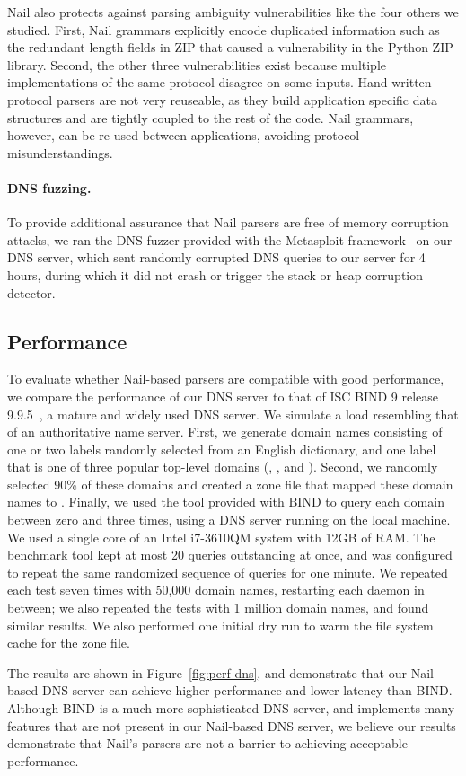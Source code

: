 Nail also protects against parsing ambiguity vulnerabilities like the four others we studied. First,
Nail grammars explicitly encode duplicated information such as the redundant length fields in ZIP
that caused a vulnerability in the Python ZIP library. Second, the other three vulnerabilities exist
because multiple implementations of the same protocol disagree on some inputs. Hand-written protocol
parsers are not very reuseable, as they build application specific data structures and are tightly
coupled to the rest of the code. Nail grammars, however, can be re-used between applications,
avoiding protocol misunderstandings.

\paragraph{DNS fuzzing.}

To provide additional assurance that Nail parsers are free of memory
corruption attacks, we ran the DNS fuzzer provided with the Metasploit
framework~\cite{mspframework} on our DNS server, which sent randomly
corrupted DNS queries to our server for 4 hours, during which it did
not crash or trigger the stack or heap corruption detector.


\subsection{Performance}

To evaluate whether Nail-based parsers are compatible with good
performance, we compare the performance of our DNS server to that of ISC
BIND 9 release 9.9.5~\cite{bind9}, a mature and widely used DNS server.
We simulate a load resembling that of an authoritative name server.
First, we generate domain names consisting of one or two labels randomly
selected from an English dictionary, and one label that is one of
three popular top-level domains (, , and ).
Second, we randomly selected 90\% of these domains and created a zone
file that mapped these domain names to .  Finally, we used
the  tool provided with BIND to query each domain between
zero and three times, using a DNS server running on the local machine.
We used a single core of an Intel i7-3610QM system with 12GB of RAM.
The benchmark tool kept at most 20 queries outstanding at once, and
was configured to repeat the same randomized sequence of queries for
one minute.  We repeated each test seven times with 50,000 domain names,
restarting each daemon in between; we also repeated the tests with 1
million domain names, and found similar results.  We also performed one
initial dry run to warm the file system cache for the zone file.

The results are shown in Figure~\ref{fig:perf-dns}, and demonstrate that
our Nail-based DNS server can achieve higher performance and lower latency
than BIND\@.  Although BIND is a much more sophisticated DNS server,
and implements many features that are not present in our Nail-based DNS
server, we believe our results demonstrate that Nail's parsers are not
a barrier to achieving acceptable performance.



